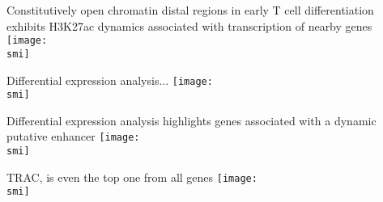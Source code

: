 \documentclass[10pt]{beamer}
\def\smi{out/ln/updir/mw-gcthesis-oral/library.bib}
\begin{document}
\begin{frame}{Constitutively open chromatin distal regions in early T cell differentiation exhibits H3K27ac dynamics associated with transcription of nearby genes}
  \def\smi{out/ln/updir/mw-gcthesis-oral/ink/atac-clusters/rnaseq-h3k27ac-with-casero.pdf}
  \texttt{[image: \\smi]}
\end{frame}
\begin{frame}{Differential expression analysis...}
  \def\smi{out/ln/updir/mw-gcthesis-oral/ink/atac-clusters/casero-violin-barplot.pdf}
  \texttt{[image: \\smi]}
\end{frame}
\begin{frame}{Differential expression analysis highlights genes associated with a dynamic putative enhancer}
  \def\smi{out/ln/updir/mw-gcthesis-oral/ink/atac-clusters/casero-violin-barplot-top-fc.pdf}
  \texttt{[image: \\smi]}
\end{frame}
\begin{frame}{TRAC, is even the top one from all genes}
  \def\smi{out/ln/updir/mw-gcthesis-oral/ink/casero-dear.pdf}
  \texttt{[image: \\smi]}%
\end{frame}
\end{document}
